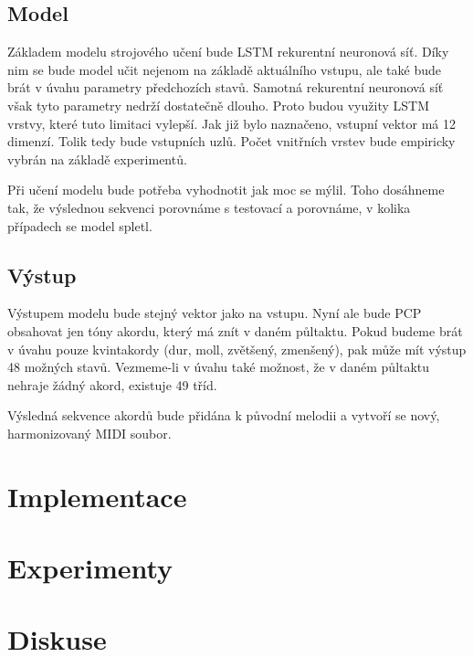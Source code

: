 \section{Model}
Základem modelu strojového učení bude LSTM rekurentní neuronová síť.
Díky nim se bude model učit nejenom na základě aktuálního vstupu,
ale také bude brát v úvahu parametry předchozích stavů.
Samotná rekurentní neuronová síť však tyto parametry nedrží dostatečně dlouho.
Proto budou využity LSTM vrstvy, 
které tuto limitaci vylepší.
Jak již bylo naznačeno, 
vstupní vektor má 12 dimenzí.
Tolik tedy bude vstupních uzlů.
Počet vnitřních vrstev bude empiricky vybrán na základě experimentů.
\par
Při učení modelu bude potřeba vyhodnotit jak
 moc se mýlil.
Toho dosáhneme tak, že výslednou sekvenci porovnáme s
testovací a porovnáme, v kolika případech se model spletl.

\section{Výstup}
Výstupem modelu bude stejný vektor jako na vstupu.
Nyní ale bude PCP obsahovat jen tóny akordu, 
který má znít v daném půltaktu.
Pokud budeme brát v úvahu pouze kvintakordy (dur, moll, zvětšený, zmenšený),
pak může mít výstup 48 možných stavů.
Vezmeme-li v úvahu také možnost, že v daném půltaktu nehraje žádný akord,
existuje 49 tříd.
\par

Výsledná sekvence akordů bude přidána k původní melodii
a vytvoří se nový, harmonizovaný MIDI soubor.




\chapter{Implementace}

\chapter{Experimenty}

\chapter{Diskuse}

